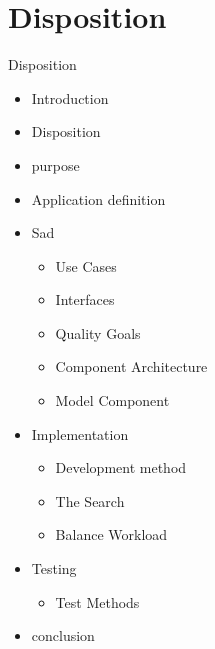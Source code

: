 \section*{Disposition}
\begin{frame}{Disposition}
\begin{itemize}
	\item Introduction
	\item Disposition
	\item purpose
	\item Application definition
	\item Sad
	\begin{itemize}
		\item Use Cases
		\item Interfaces
		\item Quality Goals
		\item Component Architecture
		\item 	Model Component	
	\end{itemize}
	\item Implementation
	\begin{itemize}
		\item Development method
		\item The Search
		\item Balance Workload
	\end{itemize}	
	\item Testing
	\begin{itemize}
		\item Test Methods
	\end{itemize}
	\item conclusion
\end{itemize}
\end{frame}